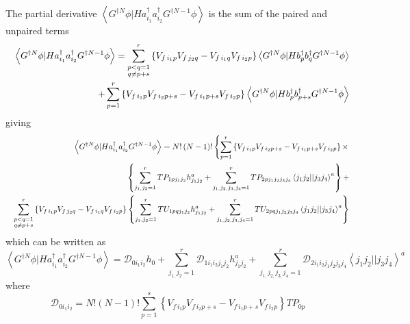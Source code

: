 \documentclass[aps,preprint]{revtex4}
\begin{document}
The partial derivative $\left\langle G^{\dagger N}\phi |Ha_{i_{1}}^{\dagger
}a_{i_{2}}^{\dagger }G^{\dagger N-1}\phi \right\rangle $ is the sum of the
paired and unpaired terms 
\begin{eqnarray}
&&\left\langle G^{\dagger N}\phi |Ha_{i_{1}}^{\dagger }a_{i_{2}}^{\dagger
}G^{\dagger N-1}\phi \right\rangle =\sum_{\substack{ p<q=1 \\ q\neq p+s}}%
^{r}\left\{ V_{f\,i_{1}p}V_{f\,j_{2}q}-V_{f\,i_{1}q}V_{f\,i_{2}p}\right\}
\left\langle G^{\dagger N}\phi |Hb_{p}^{\dagger }b_{q}^{\dagger }G^{\dagger
N-1}\phi \right\rangle   \notag \\
&&\qquad \qquad \qquad \qquad +\sum_{p=1}^{r}\left\{
V_{f\,i_{1}p}V_{f\,i_{2}p+s}-V_{f\,i_{1}p+s}V_{f\,i_{2}p}\right\}
\left\langle G^{\dagger N}\phi |Hb_{p}^{\dagger }b_{p+s}^{\dagger
}G^{\dagger N-1}\phi \right\rangle 
\end{eqnarray}%
giving%
\begin{eqnarray}
&&\left\langle G^{\dagger N}\phi |Ha_{i_{1}}^{\dagger }a_{i_{2}}^{\dagger
}G^{\dagger N-1}\phi \right\rangle =N!\left( N-1\right) !\left\{
\sum_{p=1}^{r}\left\{
V_{f\,i_{1}p}V_{f\,i_{2}p+s}-V_{f\,i_{1}p+s}V_{f\,i_{2}p}\right\} \times
\right.   \notag \\
&&\qquad \qquad \qquad \qquad \left\{
\sum_{j_{1,}j_{2}=1}^{r}TP_{1pj_{1}j_{2}}h_{j_{1}j_{2}}^{a}+%
\sum_{j_{1,}j_{2,}j_{3,}j_{4}=1}^{r}TP_{2pj_{1}j_{2}j_{3}j_{4}}\left\langle
j_{1}j_{2}||j_{3}j_{4}\right\rangle ^{a}\right\} +  \notag \\
&&\sum_{\substack{ p<q=1 \\ q\neq p+s}}^{r}\left\{
V_{f\,i_{1}p}V_{f\,j_{2}q}-V_{f\,i_{1}q}V_{f\,i_{2}p}\right\} \left\{
\sum_{j_{1},j_{2}=1}^{r}TU_{1pqj_{1}j_{2}}h_{j_{1}j_{2}}^{a}+%
\sum_{j_{1,}j_{2,}j_{3,}j_{4}=1}^{r}TU_{2pqj_{1}j_{2}j_{3}j_{4}}\left\langle
j_{1}j_{2}||j_{3}j_{4}\right\rangle ^{a}\right\} 
\end{eqnarray}%
which can be written as 
\begin{equation}
\left\langle G^{\dagger N}\phi |Ha_{i_{1}}^{\dagger }a_{i_{2}}^{\dagger
}G^{\dagger N-1}\phi \right\rangle =\mathcal{D}_{0i_{1}i_{2}}h_{0}+%
\sum_{j_{1,}j_{2}=1}^{r}\mathcal{D}%
_{1i_{1}i_{2}j_{1}j_{2}}h_{j_{1}j_{2}}^{a}+%
\sum_{j_{1,}j_{2,}j_{3,}j_{4}=1}^{r}\mathcal{D}%
_{2i_{1}i_{2}j_{1}j_{2}j_{3}j_{4}}\left\langle
j_{1}j_{2}||j_{3}j_{4}\right\rangle ^{a}  \label{matel}
\end{equation}%
where%
\begin{equation}
\mathcal{D}_{0i_{1}i_{2}}=N!\left( N-1\right) !\sum_{p=1}^{s}\left\{
V_{f\,i_{1}p}V_{f\,i_{2}p+s}-V_{f\,i_{1}p+s}V_{f\,i_{2}p}\right\} TP_{0p}
\end{equation}%
\end{document}
